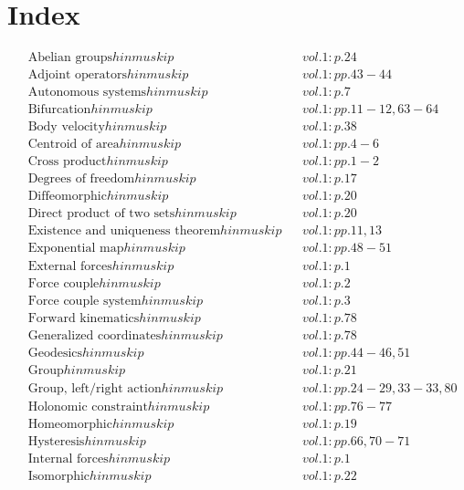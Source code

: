 \documentclass[a4paper]{article}
\begin{document}
 
\section*{Index} 
\allowdisplaybreaks 
\begin{align*} 
&\text{Abelian groups} 	hinmuskip&& vol. 1: p. 24\\
&\text{Adjoint operators} 	hinmuskip&& vol. 1: pp. 43-44\\
&\text{Autonomous systems} 	hinmuskip&& vol. 1: p. 7\\
&\text{Bifurcation} 	hinmuskip&& vol. 1: pp. 11-12, 63-64\\
&\text{Body velocity} 	hinmuskip&& vol. 1: p. 38\\
&\text{Centroid of area} 	hinmuskip&& vol. 1: pp. 4-6\\
&\text{Cross product} 	hinmuskip&& vol. 1: pp. 1-2\\
&\text{Degrees of freedom} 	hinmuskip&& vol. 1: p. 17\\
&\text{Diffeomorphic} 	hinmuskip&& vol. 1: p. 20\\
&\text{Direct product of two sets} 	hinmuskip&& vol. 1: p. 20\\
&\text{Existence and uniqueness theorem} 	hinmuskip&& vol. 1: pp. 11, 13\\
&\text{Exponential map} 	hinmuskip&& vol. 1: pp. 48-51\\
&\text{External forces} 	hinmuskip&& vol. 1: p. 1\\
&\text{Force couple} 	hinmuskip&& vol. 1: p. 2\\
&\text{Force couple system} 	hinmuskip&& vol. 1: p. 3\\
&\text{Forward kinematics} 	hinmuskip&& vol. 1: p. 78\\
&\text{Generalized coordinates} 	hinmuskip&& vol. 1: p. 78\\
&\text{Geodesics} 	hinmuskip&& vol. 1: pp. 44-46, 51\\
&\text{Group} 	hinmuskip&& vol. 1: p. 21\\
&\text{Group, left/right action} 	hinmuskip&& vol. 1: pp. 24-29, 33-33, 80\\
&\text{Holonomic constraint} 	hinmuskip&& vol. 1: pp. 76-77\\
&\text{Homeomorphic} 	hinmuskip&& vol. 1: p. 19\\
&\text{Hysteresis} 	hinmuskip&& vol. 1: pp. 66, 70-71\\
&\text{Internal forces} 	hinmuskip&& vol. 1: p. 1\\
&\text{Isomorphic} 	hinmuskip&& vol. 1: p. 22\\

\end{align*}
\end{document}
